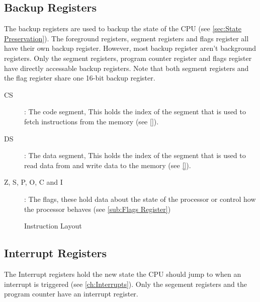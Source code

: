 \documentclass[oneside, a4paper]{memoir}
\begin{document}
\subsection{Backup Registers}
The backup registers are used to backup the state of the CPU (see \autoref{sec:State Preservation}). The foreground registers, segment registers and flags register all have their own backup register. However, most backup register aren't background registers. Only the segment registers, program counter register and flags register have directly accessable backup registers. Note that both segment registers and the flag register share one 16-bit backup register.
\begin{description}
\item[CS]: The code segment, This holds the index of the segment that is used to fetch instructions from the memory (see \autoref{}).
\item[DS]: The data segment, This holds the index of the segment that is used to read data from and write data to the memory (see \autoref{}).
\item[Z, S, P, O, C and I]: The flags, these hold data about the state of the processor or control how the processor behaves (see \autoref{sub:Flags Register})
\end{description}
\begin{figure}[h!]
\begin{center}
\caption{Instruction Layout}
\end{center}
\end{figure}
\subsection{Interrupt Registers}
The Interrupt registers hold the new state the CPU should jump to when an interrupt is triggered (see \autoref{ch:Interrupts}). Only the segement registers and the program counter have an interrupt register.
\end{document}
